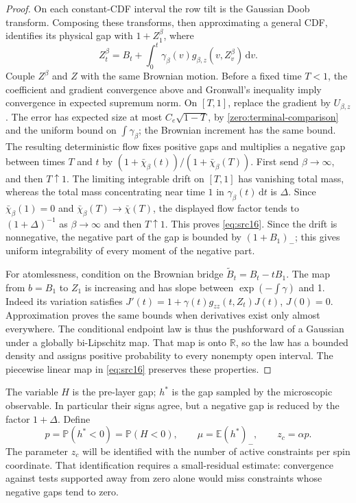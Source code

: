 \documentclass[11pt,a4paper]{article}
\numberwithin{equation}{section}
\theoremstyle{definition}
\theoremstyle{remark}
\newcommand{\E}{\mathbb E}
\newcommand{\Prob}{\mathbb P}
\newcommand{\R}{\mathbb R}
\newcommand{\dd}{\mathrm d}
\begin{document}
\begin{proof}
On each constant-CDF interval the row tilt is the Gaussian Doob
transform.  Composing these transforms, then approximating a general
CDF, identifies its physical gap with $1+Z_1^\beta$, where
\[
 Z_t^\beta=B_t+\int_0^t
       \gamma_\beta(v)g_{\beta,z}(v,Z_v^\beta)\,\dd v.
\]
Couple $Z^\beta$ and $Z$ with the same Brownian motion.  Before a fixed time \(T<1\), the coefficient and
gradient convergence above and Gronwall's inequality imply convergence
in expected supremum norm.  On \([T,1]\), replace the gradient by
\(U_{\beta,z}\).  The error has expected size at most
\(C_e\sqrt{1-T}\), by \eqref{zero:terminal-comparison} and the uniform
bound on \(\int\gamma_\beta\); the Brownian increment has the same
bound.  The resulting deterministic flow fixes positive gaps and
multiplies a negative gap between times \(T\) and \(t\) by
\((1+\bar\chi_\beta(t))/(1+\bar\chi_\beta(T))\).
First send \(\beta\to\infty\), and then \(T\uparrow1\).
The limiting integrable drift on \([T,1]\) has vanishing total
mass, whereas the total mass concentrating near time $1$ in
$\gamma_\beta(t)\,\dd t$ is $\Delta$.  Since
$\bar\chi_\beta(1)=0$ and $\bar\chi_\beta(T)\to\bar\chi(T)$,
the displayed flow factor tends to $(1+\Delta)^{-1}$ as
$\beta\to\infty$ and then $T\uparrow1$.  This proves
\eqref{eq:src16}.
Since the drift is nonnegative, the negative part of the gap is
bounded by \((1+B_1)_-\); this gives uniform integrability of every
moment of the negative part.

For atomlessness, condition on the Brownian bridge
\(\widetilde B_t=B_t-tB_1\).  The map from \(b=B_1\) to \(Z_1\)
is increasing and has slope between \(\exp(-\int\gamma)\) and 1.
Indeed its variation satisfies
\(J'(t)=1+\gamma(t)g_{zz}(t,Z_t)J(t)\), \(J(0)=0\).
Approximation proves the same bounds when derivatives exist only
almost everywhere.  The conditional endpoint law is thus the
pushforward of a Gaussian under a globally bi-Lipschitz map.
That map is onto \(\R\), so the law has a bounded density and
assigns positive probability to every nonempty open interval.  The piecewise linear map in
\eqref{eq:src16} preserves these properties.
\end{proof}

The variable $H$ is the pre-layer gap; $h^*$ is the gap sampled by the
microscopic observable.  In particular their signs agree, but a negative
gap is reduced by the factor $1+\Delta$.  Define
\[
 p=\Prob(h^*<0)=\Prob(H<0),\qquad
 \mu=\E(h^*)_-,\qquad z_c=\alpha p.
\]
The parameter $z_c$ will be identified with the number of active
constraints per spin coordinate.  That identification requires a
small-residual estimate: convergence against tests supported away from
zero alone would miss constraints whose negative gaps tend to zero.
\end{document}

